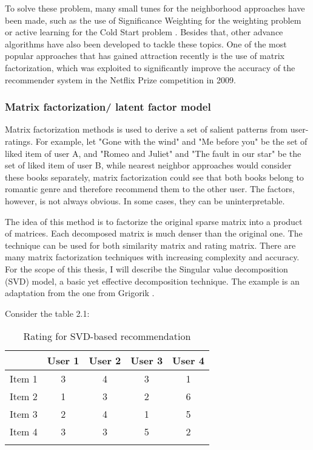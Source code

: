 To solve these problem, many small tunes for the neighborhood approaches have been made, such as the use of Significance Weighting \cite{bellogin2014neighbor} for the weighting problem or active learning for the Cold Start problem \cite{elahi2014active}. Besides that, other advance algorithms have also been developed to tackle these topics. One of the most popular approaches that has gained attraction recently is the use of matrix factorization, which was exploited to significantly improve the accuracy of the recommender system in the Netflix Prize competition in 2009.

\subsubsection{Matrix factorization/ latent factor model}
Matrix factorization methods is used to derive a set of salient patterns from user-ratings. For example, let "Gone with the wind" and "Me before you" be the set of liked item of user A, and "Romeo and Juliet" and "The fault in our star" be the set of liked item of user B, while nearest neighbor approaches would consider these books separately, matrix factorization could see that both books belong to romantic genre and therefore recommend them to the other user. The factors, however, is not always obvious. In some cases, they can be uninterpretable.

The idea of this method is to factorize the original sparse matrix into a product of matrices. Each decomposed matrix is much denser than the original one. The technique can be used for both similarity matrix and rating matrix. There are many matrix factorization techniques with increasing complexity and accuracy. For the scope of this thesis, I will describe the Singular value decomposition (SVD) model, a basic yet effective decomposition technique. The example is an adaptation from the one from Grigorik \cite{Grigorik2017}. 

Consider the table 2.1:

\begin{table}
\centering
\begin{tabular}{c c c c c}
\hline\hline
& User 1 & User 2 & User 3 & User 4 \\
\hline
Item 1 & 3 & 4 & 3 & 1 \\
Item 2 & 1 & 3 & 2 & 6 \\
Item 3 & 2 & 4 & 1 & 5 \\
Item 4 & 3 & 3 & 5 & 2 \\

\hline\hline \\
\end{tabular}
\caption{Rating for SVD-based recommendation}
\label{table:1}
\end{table}

